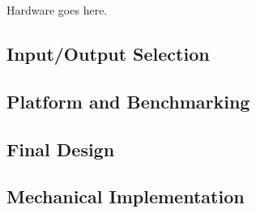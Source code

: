 Hardware goes here.

\subsection{Input/Output Selection}

\subsection{Platform and Benchmarking}

\subsection{Final Design}

\subsection{Mechanical Implementation}